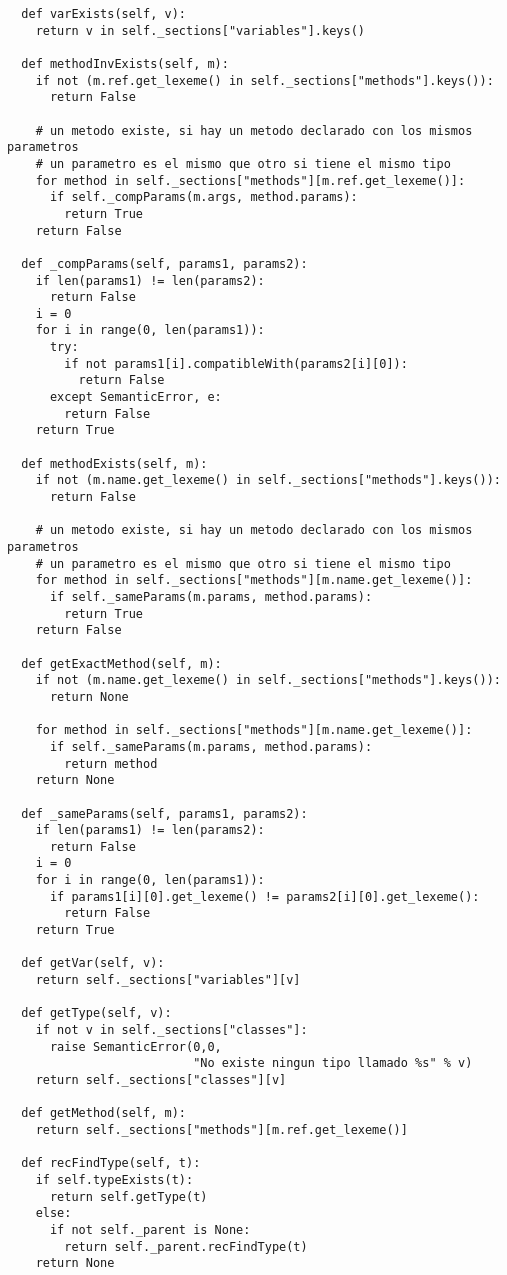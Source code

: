 \documentclass [a4paper,abstracton,titlepage]{scrartcl}
\begin{document}
\begin{lstlisting}
  def varExists(self, v):
    return v in self._sections["variables"].keys()

  def methodInvExists(self, m):
    if not (m.ref.get_lexeme() in self._sections["methods"].keys()):
      return False

    # un metodo existe, si hay un metodo declarado con los mismos parametros
    # un parametro es el mismo que otro si tiene el mismo tipo
    for method in self._sections["methods"][m.ref.get_lexeme()]:
      if self._compParams(m.args, method.params):
        return True
    return False

  def _compParams(self, params1, params2):
    if len(params1) != len(params2):
      return False
    i = 0
    for i in range(0, len(params1)):
      try:
        if not params1[i].compatibleWith(params2[i][0]):
          return False
      except SemanticError, e:
        return False
    return True

  def methodExists(self, m):
    if not (m.name.get_lexeme() in self._sections["methods"].keys()):
      return False

    # un metodo existe, si hay un metodo declarado con los mismos parametros
    # un parametro es el mismo que otro si tiene el mismo tipo
    for method in self._sections["methods"][m.name.get_lexeme()]:
      if self._sameParams(m.params, method.params):
        return True
    return False

  def getExactMethod(self, m):
    if not (m.name.get_lexeme() in self._sections["methods"].keys()):
      return None

    for method in self._sections["methods"][m.name.get_lexeme()]:
      if self._sameParams(m.params, method.params):
        return method
    return None

  def _sameParams(self, params1, params2):
    if len(params1) != len(params2):
      return False
    i = 0
    for i in range(0, len(params1)):
      if params1[i][0].get_lexeme() != params2[i][0].get_lexeme():
        return False
    return True

  def getVar(self, v):
    return self._sections["variables"][v]

  def getType(self, v):
    if not v in self._sections["classes"]:
      raise SemanticError(0,0,
                          "No existe ningun tipo llamado %s" % v)
    return self._sections["classes"][v]

  def getMethod(self, m):
    return self._sections["methods"][m.ref.get_lexeme()]

  def recFindType(self, t):
    if self.typeExists(t):
      return self.getType(t)
    else:
      if not self._parent is None:
        return self._parent.recFindType(t)
    return None


\end{lstlisting}
\end{document}
